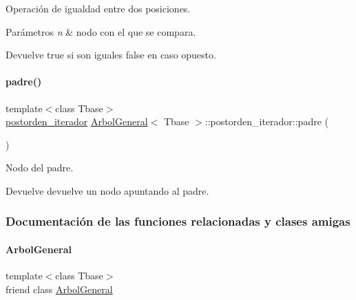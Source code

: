 Operación de igualdad entre dos posiciones. 


\begin{DoxyParams}{Parámetros}
{\em n} & nodo con el que se compara. \\
\hline
\end{DoxyParams}
\begin{DoxyReturn}{Devuelve}
true si son iguales false en caso opuesto. 
\end{DoxyReturn}
\hypertarget{classArbolGeneral_1_1postorden__iterador_a939b113299035ac4f56c1ebc8c7de763}{}\label{classArbolGeneral_1_1postorden__iterador_a939b113299035ac4f56c1ebc8c7de763} 
\paragraph{\texorpdfstring{padre()}{padre()}}
{\footnotesize\ttfamily template$<$class Tbase$>$ \\
\hyperlink{classArbolGeneral_1_1postorden__iterador}{postorden\+\_\+iterador} \hyperlink{classArbolGeneral}{Arbol\+General}$<$ Tbase $>$\+::postorden\+\_\+iterador\+::padre (\begin{DoxyParamCaption}{ }\end{DoxyParamCaption})\hspace{0.3cm}{\ttfamily [inline]}}



Nodo del padre. 

\begin{DoxyReturn}{Devuelve}
devuelve un nodo apuntando al padre. 
\end{DoxyReturn}


\subsubsection{Documentación de las funciones relacionadas y clases amigas}
\hypertarget{classArbolGeneral_1_1postorden__iterador_a9c06e31b7c3e0d4ee5b03003d32935a5}{}\label{classArbolGeneral_1_1postorden__iterador_a9c06e31b7c3e0d4ee5b03003d32935a5} 
\paragraph{\texorpdfstring{Arbol\+General}{ArbolGeneral}}
{\footnotesize\ttfamily template$<$class Tbase$>$ \\
friend class \hyperlink{classArbolGeneral}{Arbol\+General}\hspace{0.3cm}{\ttfamily [friend]}}



